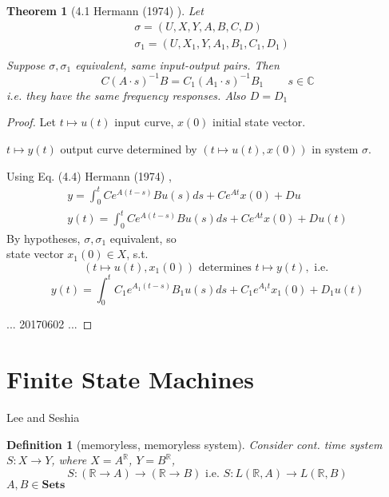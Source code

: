 \documentclass[10pt]{amsart}
\newtheorem{theorem}{Theorem}
\newtheorem{definition}{Definition}
\begin{document}
\begin{multicols*}{2}
\begin{theorem}[4.1 Hermann (1974) \cite{Herm1974}]
Let 
\[
\begin{aligned}
&	\sigma = (U,X,Y,A,B,C,D) \\ 
&	\sigma_1 = (U,X_1,Y,A_1,B_1,C_1,D_1) \\ 
\end{aligned}
\]
Suppose $\sigma,\sigma_1$ equivalent, same input-output pairs.  Then
\begin{equation}
	C(A\cdot s)^{-1}B = C_1(A_1\cdot s)^{-1}B_1 \qquad \, s \in \mathbb{C}
\end{equation}
i.e. they have the same frequency responses.  Also $D=D_1$
\end{theorem}

\begin{proof}
Let $t \mapsto u(t)$ input curve, $x(0)$ initial state vector.  

$t\mapsto y(t)$ output curve determined by $(t\mapsto u(t), x(0))$ in system $\sigma$.  

Using Eq. (4.4) Hermann (1974) \cite{Herm1974}, 
\begin{equation}
\begin{gathered}
	y = \int_0^t Ce^{A(t-s) } Bu(s) ds + Ce^{At} x(0) + Du \\ 
y(t) = \int_0^t Ce^{A(t-s)} Bu(s) ds + Ce^{At } x(0) + Du(t) 
\end{gathered}
\end{equation}
By hypotheses, $\sigma,\sigma_1$ equivalent, so  \\

state vector $x_1(0) \in X$, s.t.
\[
(t\mapsto u(t), x_1(0)) \text{ determines } t\mapsto y(t), \text{ i.e. } 
\]
\[
y(t) = \int_0^t C_1 e^{A_1(t-s) } B_1u(s) ds + C_1 e^{A_1t } x_1(0) + D_1u(t)
\]

... 20170602 ...

\end{proof}


\section{Finite State Machines}  

Lee and Seshia \cite{LeSe2017}


\begin{definition}[memoryless, memoryless system]  
Consider cont. time system $S: X\to Y$, where $X= A^{\mathbb{R}}$, $Y=B^{\mathbb{R}}$, 
\[
S:(\mathbb{R}\to A) \to (\mathbb{R} \to B) \text{ i.e. } S:L(\mathbb{R},A) \to L(\mathbb{R},B) 
\]
$A,B\in \textbf{Sets}$


\end{definition}
\end{multicols*}
\end{document}
